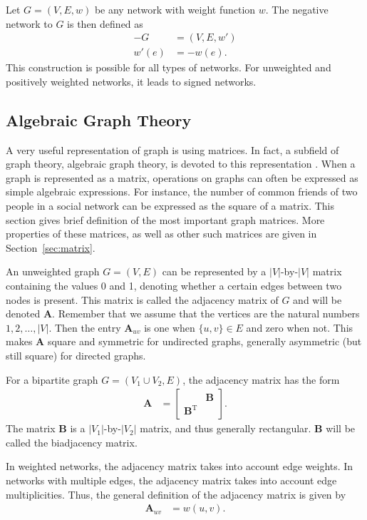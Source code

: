 \documentclass{article}
\begin{document}
Let $G=(V,E,w)$ be any network with weight function $w$.  The negative
network to $G$ is then defined as
\begin{align}
  -G &= (V, E, w') \\
  w'(e) &= -w(e). \nonumber
\end{align}
This construction is possible for all types of networks. For unweighted
and positively weighted networks, it leads to signed networks. 

\subsection{Algebraic Graph Theory}
A very useful representation of graph is using matrices. In fact, a
subfield of graph theory, algebraic graph theory, is devoted to
this representation \citep{b118}.  When a graph is represented as a
matrix, operations on graphs can often be expressed as simple algebraic
expressions.  For instance, the number of common friends of
two people in a social network can be expressed as the square of a
matrix. 
This section gives brief definition of the most important graph
matrices.  More properties of these matrices, as well as other such
matrices are given in Section~\ref{sec:matrix}. 

An unweighted graph $G=(V,E)$ can be represented by a $|V|$-by-$|V|$
matrix containing the values 0 and 1, denoting whether a certain edges
between two nodes is present.  This matrix is called the adjacency
matrix of $G$ and will be denoted $\mathbf A$.  Remember that we assume
that the vertices are the natural numbers $1, 2, \dotsc, |V|$.  Then the
entry $\mathbf A_{uv}$ is one when $\{u,v\} \in E$ and zero when not.
This makes $\mathbf A$ square and symmetric for undirected graphs, generally
asymmetric (but still square) for directed graphs.  

For a bipartite graph $G=(V_1 \cup V_2, E)$, the adjacency matrix has
the form 
\begin{align}
  \mathbf A &= \left[ \begin{array}{cc} & \mathbf B \\
      \mathbf B^{\mathrm T} & \end{array} \right].
\end{align}
The matrix $\mathbf B$ is a $|V_1|$-by-$|V_2|$ matrix, and thus
generally rectangular. $\mathbf B$ will be called the biadjacency
matrix. 

In weighted networks, the adjacency matrix takes into account edge
weights.  In networks with multiple edges, the adjacency matrix takes
into account edge multiplicities. Thus, the general definition of the
adjacency matrix is given by
\begin{align}
  \mathbf A_{uv} &= w(u, v). 
\end{align}
\end{document}
